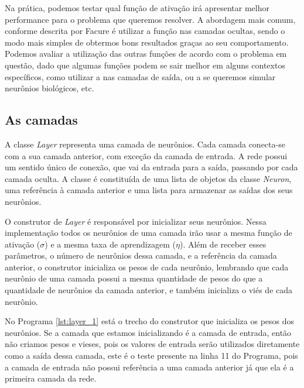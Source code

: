 Na prática, podemos testar qual função de ativação irá apresentar melhor performance para o problema que queremos resolver. A abordagem mais comum, conforme descrita por Facure \citep{matheus} é utilizar a função  nas camadas ocultas, sendo o modo mais simples de obtermos bons resultados graças ao seu comportamento. Podemos avaliar a utilização das outras funções de acordo com o problema em questão, dado que algumas funções podem se sair melhor em alguns contextos específicos, como utilizar a  nas camadas de saída, ou a  se queremos simular neurônios biológicos, etc.

\subsection{As camadas}

A classe \emph{Layer} representa uma camada de neurônios. Cada camada conecta-se com a sua camada anterior, com exceção da camada de entrada. A rede  possui um sentido único de conexão, que vai da entrada para a saída, passando por cada camada oculta. A classe é constituída de uma lista de objetos da classe \emph{Neuron}, uma referência à camada anterior e uma lista para armazenar as saídas dos seus neurônios.

O construtor de \emph{Layer} é responsável por inicializar seus neurônios. Nessa implementação todos os neurônios de uma camada irão usar a mesma função de ativação ($\sigma$) e a mesma taxa de aprendizagem ($\eta$). Além de receber esses parâmetros, o número de neurônios dessa camada, e a referência da camada anterior, o construtor inicializa os pesos de cada neurônio, lembrando que cada neurônio de uma camada possui a mesma quantidade de pesos do que a quantidade de neurônios da camada anterior, e também inicializa o viés de cada neurônio. 

No Programa \ref{lst:layer_1} está o trecho do construtor que inicializa os pesos dos neurônios. Se a camada que estamos inicializando é a camada de entrada, então não criamos pesos e vieses, pois os valores de entrada serão utilizados diretamente como a saída dessa camada, este é o teste presente na linha 11 do Programa, pois a camada de entrada não possui referência a uma camada anterior já que ela é a primeira camada da rede.

